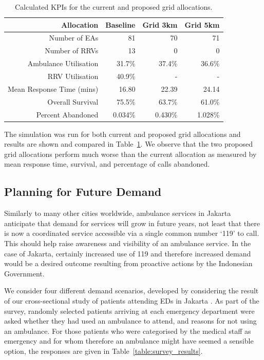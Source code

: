 \documentclass[preprint,12pt]{elsarticle}
\begin{document}
\begin{table}
\begin{center}
\begin{tabular}{rrrr}
\toprule
Allocation & Baseline & Grid 3km & Grid 5km \\
\midrule
Number of EAs & 81 & 70 & 71 \\
Number of RRVs & 13 & 0 & 0 \\
Ambulance Utilisation & 31.7\% & 37.4\% & 36.6\% \\
RRV Utilisation & 40.9\% & - & - \\
Mean Response Time (mins) & 16.80 & 22.39 & 24.14 \\
Overall Survival & 75.5\% & 63.7\% & 61.0\% \\
Percent Abandoned & 0.034\% & 0.430\% & 1.028\% \\
\bottomrule
\end{tabular}
\caption{Calculated KPIs for the current and proposed grid allocations.}
\label{tbl:current_grid_results}
\end{center}
\end{table}

The simulation was run for both current  and proposed grid allocations and results are shown and compared in Table~\ref{tbl:current_grid_results}.  We observe that the two proposed grid allocations perform much worse than the current allocation as measured by mean response time, survival, and percentage of calls abandoned.

\subsection{Planning for Future Demand}\label{sec:demand_scenarios}
Similarly to many other cities worldwide, ambulance services in Jakarta anticipate that demand for services will grow in future years, not least that there is now a coordinated service accessible via a single common number `119' to call. This should help raise awareness and visibility of an ambulance service. In the case of Jakarta, certainly increased use of 119 and therefore increased demand would be a desired outcome resulting from proactive actions by the Indonesian Government. 

We consider four different demand scenarios, developed by considering the result of our cross-sectional study of patients attending EDs in Jakarta \cite{BriceSyaribahNoor2022Esui}. As part of the survey, randomly selected patients arriving at each emergency department were asked whether they had used an ambulance to attend, and reasons for not using an ambulance. For those patients who were categorised by the medical staff as emergency and for whom therefore an ambulance might have seemed a sensible option, the responses are given in Table~\ref{table:survey_results}.
\end{document}

